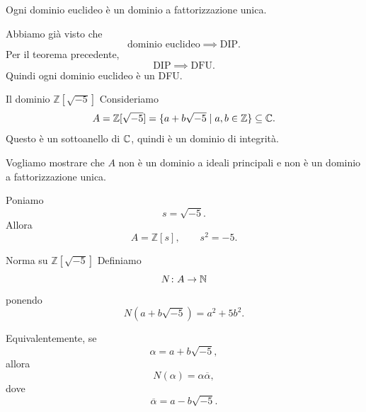 \documentclass[a4paper]{article}
\begin{document}
\begin{radioactive}
\begin{snippetcorollary}{}
    Ogni dominio euclideo è un dominio a fattorizzazione unica.
\end{snippetcorollary}
\end{radioactive}

\begin{radioactive}
\begin{snippetproof}{}
    Abbiamo già visto che
    \[
        \text{dominio euclideo}
        \implies
        \text{DIP}.
    \]
    Per il teorema precedente,
    \[
        \text{DIP}
        \implies
        \text{DFU}.
    \]
    Quindi ogni dominio euclideo è un DFU.
\end{snippetproof}
\end{radioactive}

\begin{radioactive}
\begin{snippetexample}{Il dominio \(\mathbb{Z}[\sqrt{-5}]\)}
    Consideriamo
    \[
        A=\mathbb{Z}[\sqrt{-5}]
        =
        \{a+b\sqrt{-5}\mid a,b\in\mathbb{Z}\}
        \subseteq \mathbb{C}.
    \]
    Questo è un sottoanello di \(\mathbb{C}\), quindi è un dominio di integrità.

    Vogliamo mostrare che \(A\) non è un dominio a ideali principali e non è un dominio a fattorizzazione unica.
\end{snippetexample}
\end{radioactive}

\begin{radioactive}
Poniamo
\[
    s=\sqrt{-5}.
\]
Allora
\[
    A=\mathbb{Z}[s],
    \qquad
    s^2=-5.
\]
\end{radioactive}

\begin{radioactive}
\begin{snippetdefinition}{Norma su \(\mathbb{Z}[\sqrt{-5}]\)}
    Definiamo
    \[
        N\colon A\to \mathbb{N}
    \]
    ponendo
    \[
        N(a+b\sqrt{-5})
        =
        a^2+5b^2.
    \]
\end{snippetdefinition}
\end{radioactive}

\begin{radioactive}
Equivalentemente, se
\[
    \alpha=a+b\sqrt{-5},
\]
allora
\[
    N(\alpha)=\alpha\overline{\alpha},
\]
dove
\[
    \overline{\alpha}=a-b\sqrt{-5}.
\]
\end{radioactive}
\end{document}
